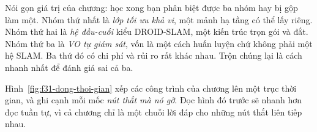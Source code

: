 \documentclass[../../deep_learning.tex]{subfiles}
\begin{document}
Nói gọn giá trị của chương: học xong bạn phân biệt được ba nhóm hay bị gộp làm một. Nhóm thứ nhất là \emph{lớp tối ưu khả vi}, một mảnh hạ tầng có thể lấy riêng. Nhóm thứ hai là \emph{hệ đầu-cuối} kiểu DROID-SLAM, một kiến trúc trọn gói và đắt. Nhóm thứ ba là \emph{VO tự giám sát}, vốn là một cách huấn luyện chứ không phải một hệ SLAM. Ba thứ đó có chi phí và rủi ro rất khác nhau. Trộn chúng lại là cách nhanh nhất để đánh giá sai cả ba.

Hình~\ref{fig:f31-dong-thoi-gian} xếp các công trình của chương lên một trục thời gian, và ghi cạnh mỗi mốc \emph{nút thắt mà nó gỡ}. Đọc hình đó trước sẽ nhanh hơn đọc tuần tự, vì cả chương chỉ là một chuỗi lời đáp cho những nút thắt liên tiếp nhau.

\begin{figure}[H]\centering
{}
\end{figure}
\end{document}
